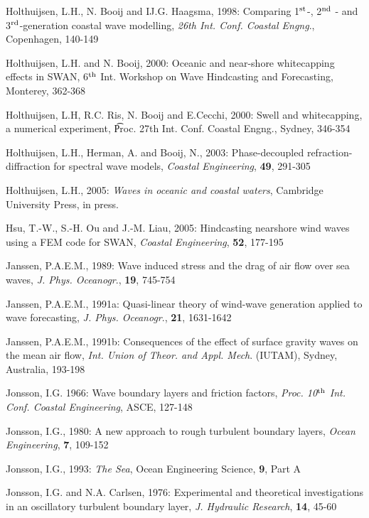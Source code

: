 \documentclass[12pt]{book}
\begin{document}
\begin{thebibliography}{10}
Holthuijsen, L.H., N. Booij and IJ.G. Haagsma, 1998: Comparing 1$^{{\rm st}}$-, 2$^{{\rm nd}}$ - and 3$^{{\rm rd}}$-generation
coastal wave modelling,  {\it 26th Int. Conf. Coastal Engng}., Copenhagen, 140-149

Holthuijsen, L.H. and N. Booij, 2000: Oceanic and near-shore whitecapping effects in SWAN, 6$^{{\rm th}}$ Int.
Workshop on Wave Hindcasting and Forecasting, Monterey, 362-368

Holthuijsen, L.H, R.C. Ris, N. Booij and E.Cecchi, 2000: Swell and whitecapping, a numerical experiment,
{\t Proc. 27th Int. Conf. Coastal Engng.}, Sydney, 346-354

Holthuijsen, L.H., Herman, A. and Booij, N., 2003: Phase-decoupled refraction-diffraction for
spectral wave models, {\it Coastal Engineering}, {\bf 49}, 291-305

Holthuijsen, L.H., 2005: {\it Waves in oceanic and coastal waters},
Cambridge University Press, in press.

Hsu, T.-W., S.-H. Ou and J.-M. Liau, 2005: Hindcasting nearshore wind waves using a FEM code for SWAN,
{\it Coastal Engineering}, {\bf 52}, 177-195

Janssen, P.A.E.M., 1989: Wave induced stress and the drag of air flow over sea waves, {\it J. Phys.
Oceanogr}., {\bf 19}, 745-754

Janssen, P.A.E.M., 1991a: Quasi-linear theory of wind-wave generation applied to wave forecasting, {\it J.
Phys. Oceanogr}., {\bf 21}, 1631-1642

Janssen, P.A.E.M., 1991b: Consequences of the effect of surface gravity waves on the mean air flow, {\it Int.
Union of Theor. and Appl. Mech}. (IUTAM), Sydney, Australia, 193-198

Jonsson, I.G. 1966: Wave boundary layers and friction factors, {\it Proc. 10$^{{\rm th}}$ Int. Conf. Coastal Engineering},
ASCE, 127-148

Jonsson, I.G., 1980: A new approach to rough turbulent boundary layers, {\it Ocean Engineering}, {\bf 7}, 109-152

Jonsson, I.G., 1993: {\it The Sea}, Ocean Engineering Science, {\bf 9}, Part A

Jonsson, I.G. and N.A. Carlsen, 1976: Experimental and theoretical investigations in an oscillatory
turbulent boundary layer, {\it J. Hydraulic Research}, {\bf 14}, 45-60


\end{thebibliography}
\end{document}
